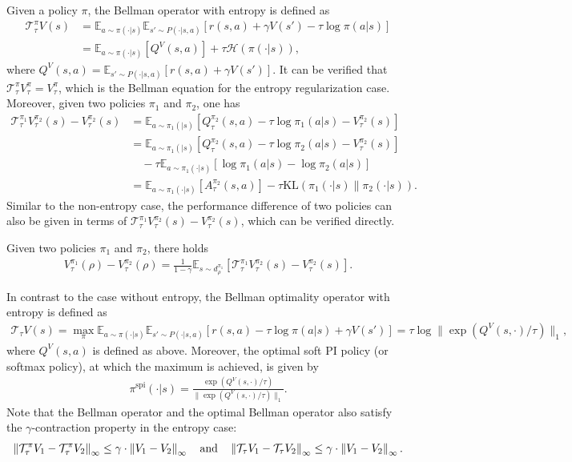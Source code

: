 Given a policy $\pi$, the Bellman operator with entropy is defined as 
\begin{align*}
\mathcal{T}^\pi_\tau V(s) 
&=\mathbb{E}_{a\sim\pi(\cdot|s)}\mathbb{E}_{s'\sim P(\cdot|s,a)}\left[r(s,a)+\gamma V(s')-\tau\log\pi(a|s)\right]\\
&=\mathbb{E}_{a\sim \pi(\cdot|s)}\left[Q^V(s,a)\right]+\tau \mathcal{H}(\pi(\cdot|s)),
\end{align*}
where $Q^V(s,a)=\mathbb{E}_{s'\sim P(\cdot|s,a)}[r(s,a)+\gamma V(s')]$. It can be verified  that $\mathcal{T}_\tau^\pi V^\pi_\tau = V_\tau^\pi$, which is the Bellman equation for the entropy regularization case. Moreover, given two policies $\pi_1$ and $\pi_2$, one has 
\begin{align*}
\mathcal{T}_\tau^{\pi_1}V_\tau^{\pi_2}(s)-V_\tau^{\pi_2}(s) & = \mathbb{E}_{a\sim\pi_1(|s)}[Q^{\pi_2}_\tau(s,a)-\tau \log\pi_1(a|s)-V_\tau^{\pi_2}(s)]\\
&=\mathbb{E}_{a\sim\pi_1(|s)}[Q^{\pi_2}_\tau(s,a)-\tau \log\pi_2(a|s)-V_\tau^{\pi_2}(s)]\\
&\quad -\tau\mathbb{E}_{a\sim \pi_1(\cdot|s)}[\log\pi_1(a|s)-\log\pi_2(a|s)]\\
& = \mathbb{E}_{a\sim\pi_1(\cdot|s)}[A^{\pi_2}_\tau(s,a)]-\tau \mathrm{KL}(\pi_1(\cdot|s)\|\pi_2(\cdot|s)).
\end{align*}
Similar to the non-entropy case, the performance difference of two policies can also be given in terms of $\mathcal{T}_\tau^{\pi_1}V_\tau^{\pi_2}(s)-V_\tau^{\pi_2}(s)$, which can be verified directly.
\begin{lemma}\label{lem:entropyPDL} Given two policies $\pi_1$ and $\pi_2$, there holds 
\begin{align*}
V^{\pi_1}_\tau(\rho)-V^{\pi_2}_\tau(\rho)=\frac{1}{1-\gamma}\mathbb{E}_{s\sim d_\rho^{\pi_1}}\left[\mathcal{T}_\tau^{\pi_1}V_\tau^{\pi_2}(s)-V_\tau^{\pi_2}(s)\right].
\end{align*}
\end{lemma}


In contrast to the case without entropy, the Bellman optimality operator with entropy is defined as 
\begin{align*}
\mathcal{T}_\tau V(s)=\max_\pi\mathbb{E}_{a\sim\pi(\cdot|s)}\mathbb{E}_{s'\sim P(\cdot|s,a)}[r(s,a)-\tau\log\pi(a|s)+\gamma V(s')]=\tau\log\|\exp(Q^V(s,\cdot)/\tau)\|_1,
\end{align*}
where $Q^V(s,a)$ is defined as above. Moreover, the optimal soft PI policy (or softmax policy), at which the maximum is achieved, is given by 
\begin{align*}
\pi^{\mathrm{spi}}(\cdot|s) = \frac{\exp(Q^V(s,\cdot)/\tau)}{\|\exp(Q^V(s,\cdot)/\tau)\|_1}.
\end{align*}
Note that the Bellman operator and the optimal Bellman operator also satisfy the $\gamma$-contraction property in the entropy case:
\begin{align*}
\left\| {\cal T}^\pi_\tau V_1 - {\cal T}^\pi_\tau V_2 \right\|_\infty \leq \gamma \cdot \left\| V_1 - V_2 \right\|_\infty\quad \mbox{and}\quad\left\| {\cal T}_\tau V_1 - {\cal T}_\tau V_2 \right\|_\infty \leq \gamma \cdot \left\| V_1 - V_2 \right\|_\infty.
\end{align*}

